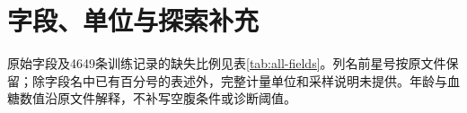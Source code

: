 \section{字段、单位与探索补充}\label{app:fields}
原始字段及4649条训练记录的缺失比例见表\ref{tab:all-fields}。列名前星号按原文件保留；除字段名中已有百分号的表述外，完整计量单位和采样说明未提供。年龄与血糖数值沿原文件解释，不补写空腹条件或诊断阈值。

